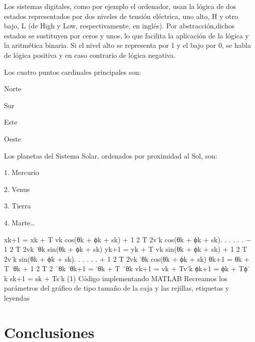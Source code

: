 \documentclass[conference,compsoc,onecolumn]{IEEEtran}
\begin{document}
Los sistemas digitales, como por ejemplo el ordenador, usan la lógica de dos estados representados por dos
niveles de tensión eléctrica, uno alto, H y otro bajo, L (de High y Low, respectivamente, en inglés). Por abstracción,dichos estados se sustituyen por ceros y unos, lo que facilita la aplicación de la lógica y la aritmética binaria. Si el
nivel alto se representa por 1 y el bajo por 0, se habla de lógica positiva y en caso contrario de lógica negativa.

Los cuatro puntos cardinales principales son:

Norte

Sur

Este

Oeste

Los planetas del Sistema Solar, ordenados por proximidad al Sol, son:

1. Mercurio

2. Venus

3. Tierra

4. Marte…

xk+1 = xk + T vk cos(θk + ϕk + sk) + 1
2
T
2v˙k cos(θk + ϕk + sk). . .
. . . −
1
2
T
2vk
˙θk sin(θk + ϕk + sk)
yk+1 = yk + T vk sin(θk + ϕk + sk) + 1
2
T
2v˙k sin(θk + ϕk + sk). . .
. . . +
1
2
T
2vk
˙θk cos(θk + ϕk + sk)
θk+1 = θk + T ˙θk +
1
2
T
2 ¨θk
˙θk+1 = ˙θk + T ¨θk
vk+1 = vk + Tv˙k
ϕk+1 = ϕk + Tϕ˙
k
sk+1 = sk + Ts˙k
(1)
Código implementando MATLAB Recreamos los parámetros del gráfico de tipo tamaño de la caja y las rejillas,
etiquetas y leyendas


\section{Conclusiones}
\label{sec:conclusions}


\nocite{*}

\label{sec:biblio}
% 





\end{document}
